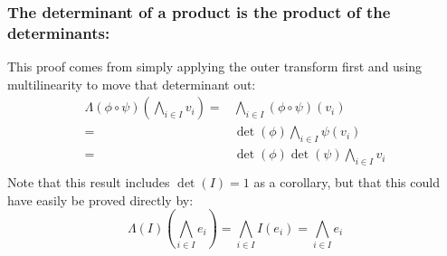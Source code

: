 \subsubsection{The determinant of a product is the product of the determinants:}
This proof comes from simply applying the outer transform first and using multilinearity to move that determinant out:
\[\begin{aligned}
	\Lambda(\phi\circ\psi)\left(\bigwedge_{i\in I}v_i\right) =&\bigwedge_{i\in I}(\phi\circ\psi)(v_i) \\
	=&\det(\phi)\bigwedge_{i\in I}\psi(v_i) \\
	=&\det(\phi)\det(\psi)\bigwedge_{i\in I}v_i \\
\end{aligned}\]
Note that this result includes $\det(I) = 1$ as a corollary,
but that this could have easily be proved directly by:
\[\Lambda(I)\left(\bigwedge_{i\in I}e_i\right) = \bigwedge_{i\in I}I(e_i) = \bigwedge_{i\in I}e_i\]
	
